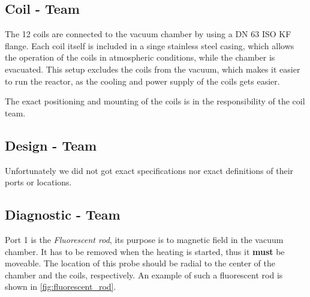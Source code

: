 \subsection{Coil - Team}


The 12 coils are connected to the vacuum chamber by using a DN 63 ISO KF flange.
Each coil itself is included in a singe stainless steel casing, which allows the operation of the coils in atmospheric conditions, while the chamber is evacuated.
This setup excludes the coils from the vacuum, which makes it easier to run the reactor, as the cooling and power supply of the coils gets easier.

The exact positioning and mounting of the coils is in the responsibility of the coil team.



\subsection{Design - Team}
%
Unfortunately we did not got exact specifications nor exact definitions of their ports or locations.

\subsection{Diagnostic - Team}


Port 1 is the \emph{Fluorescent rod}, its purpose is to magnetic field in the vacuum chamber.
It has to be removed when the heating is started, thus it \textbf{must} be moveable.
The location of this probe should be radial to the center of the chamber and the coils, respectively.
An example of such a fluorescent rod is shown in \autoref{fig:fluorescent_rod}.

